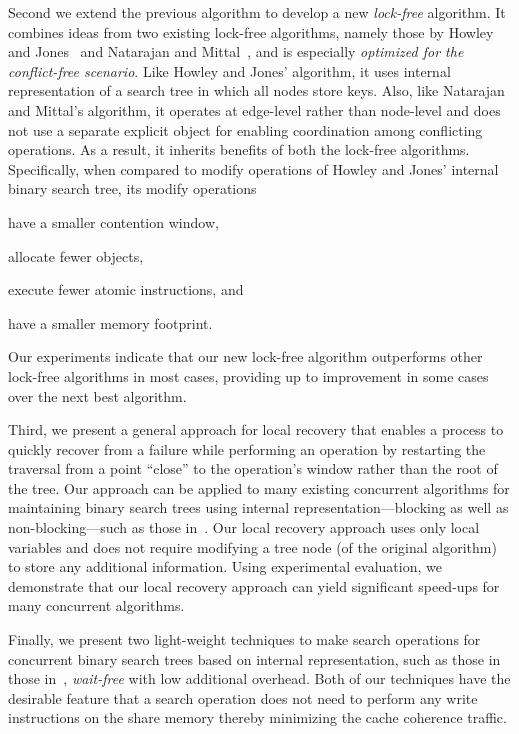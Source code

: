Second we extend the previous algorithm to develop a new \emph{lock-free} algorithm. It combines ideas from two existing lock-free algorithms, namely those by Howley and Jones~\cite{HowJon:2012:SPAA} and Natarajan and Mittal~\cite{NatMit:2014:PPoPP}, and is especially \emph{optimized for the conflict-free scenario}. Like Howley and Jones' algorithm, it uses internal representation of a search tree in which all nodes store keys. Also, like Natarajan and Mittal's algorithm, it operates at edge-level rather than node-level and does not use a separate explicit object for enabling coordination among conflicting operations. As a result, it inherits benefits of both the lock-free algorithms. Specifically, when compared to modify operations of Howley and Jones' internal binary search tree, its modify operations 
\begin{enumerate*}[label=(\alph*)]
\item have a smaller contention window, 
\item allocate fewer objects, 
\item execute fewer atomic instructions, and 
\item have a smaller memory footprint. 
\end{enumerate*}
Our experiments indicate that our new lock-free algorithm outperforms other lock-free algorithms in most cases, providing up to \icdcnMaximumgap{} improvement in some cases over the next best algorithm.

Third, we present a general approach for local recovery that enables a process to quickly recover from a failure while performing an operation by restarting the traversal from a point ``close'' to the operation's window rather than the root of the tree.  Our approach can be applied to many existing concurrent algorithms for maintaining binary search trees using internal representation---blocking as well as non-blocking---such as those in~\cite{HowJon:2012:SPAA,DraVec+:2014:PPoPP,ArbAtt:2014:PODC,RamMit:2015:PPoPP}. Our local recovery approach uses only local variables and does not require modifying a tree node (of the original algorithm) to store any additional information. Using experimental evaluation, we demonstrate that our local recovery approach can yield significant speed-ups for many concurrent algorithms.

Finally, we present two light-weight techniques to make search operations for concurrent binary search trees based on internal representation, such as those in those in~\cite{HowJon:2012:SPAA,DraVec+:2014:PPoPP,ArbAtt:2014:PODC,RamMit:2015:ICDCN,RamMit:2015:PPoPP}, \emph{wait-free} with low additional overhead. Both of our techniques have the desirable feature that a search operation does not need to perform any write instructions on the share memory thereby minimizing the cache coherence traffic.

